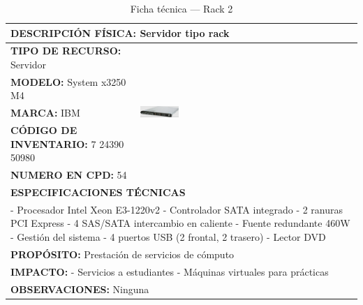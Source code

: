 \begin{table}[H]
\centering
\sffamily\scriptsize
\setlength{\tabcolsep}{3pt}
\renewcommand{\arraystretch}{1.1}
\caption{Ficha técnica --- Rack 2}
\label{tab:rack-2}
\begin{tabular}{|p{}|p{}|}
\hline
\multicolumn{2}{|l|}{\textbf{DESCRIPCIÓN FÍSICA:} Servidor tipo rack} \\ \hline
\textbf{TIPO DE RECURSO:} Servidor & 
\multirow{5}{*}{\includegraphics[width=0.18\textwidth,keepaspectratio]{tablas-images/cp1/racks/rack-1.png}} \\ \cline{1-1}
\textbf{MODELO:} System x3250 M4 & \\ \cline{1-1}
\textbf{MARCA:} IBM & \\ \cline{1-1}
\textbf{CÓDIGO DE INVENTARIO:} 7 24390 50980 & \\ \cline{1-1}
\textbf{NUMERO EN CPD:} 54 & \\ \hline
\multicolumn{2}{|l|}{\textbf{ESPECIFICACIONES TÉCNICAS}} \\ \hline
\multicolumn{2}{|p{0.7\textwidth}|}{
- Procesador Intel Xeon E3-1220v2
- Controlador SATA integrado
- 2 ranuras PCI Express
- 4 SAS/SATA intercambio en caliente
- Fuente redundante 460W
- Gestión del sistema
- 4 puertos USB (2 frontal, 2 trasero)
- Lector DVD
} \\ \hline
\multicolumn{2}{|l|}{\textbf{PROPÓSITO:} Prestación de servicios de cómputo} \\ \hline
\multicolumn{2}{|p{0.7\textwidth}|}{\textbf{IMPACTO:} 
- Servicios a estudiantes
- Máquinas virtuales para prácticas} \\ \hline
\multicolumn{2}{|p{0.7\textwidth}|}{\textbf{OBSERVACIONES:} Ninguna} \\ \hline
\end{tabular}
\end{table}

